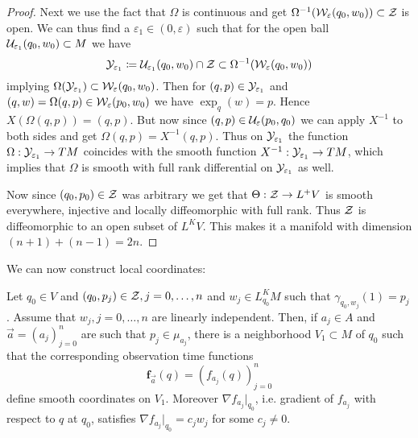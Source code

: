 \begin{proof}
    Next we use the fact that $\Omega$ is continuous and get $\Omega^{-1}({\mathcal{W}}_{\varepsilon}(q_0,w_0)) \subset {\mathcal{Z}}$ is open. We can thus find a $\varepsilon_1\in (0,\varepsilon)$ such that for the open ball ${\mathcal{U}}_{\varepsilon_1}(q_0,w_0)\subset M$ we have 
    \[
        {\mathcal{Y}}_{\varepsilon_1}\coloneqq {\mathcal{U}}_{\varepsilon_1}(q_0,w_0) \cap {\mathcal{Z}} \subset \Omega^{-1}({\mathcal{W}}_{\varepsilon}(q_0,w_0))
    \] implying $\Omega({\mathcal{Y}}_{\varepsilon_1}) \subset {\mathcal{W}}_{\varepsilon}(q_0,w_0)$. Then for $(q,p)\in {\mathcal{Y}}_{\varepsilon_1}$ and $(q,w) = \Omega(q,p)\in {\mathcal{W}}_\varepsilon(p_0,w_0)$ we have $\exp_q(w) = p$. Hence $X(\Omega(q,p))=(q,p)$. But now since $(q,p)\in \mathcal{U}_\varepsilon(p_0,q_0)$ we can apply $X^{-1}$ to both sides and get $\Omega(q,p)=X^{-1}(q,p)$. Thus on ${\mathcal{Y}}_{\varepsilon_1}$ the function $\Omega:{\mathcal{Y}}_{\varepsilon_1}\to TM$ coincides with the smooth function $X^{-1}:{\mathcal{Y}}_{\varepsilon_1}\to TM$, which implies that $\Omega$ is smooth with full rank differential on ${\mathcal{Y}}_{\varepsilon_1}$ as well.
    
    Now since $(q_0,p_0)\in {\mathcal{Z}}$ was arbitrary we get that $\Theta:{\mathcal{Z}}\to L^+V$ is smooth everywhere, injective and locally diffeomorphic with full rank. Thus ${\mathcal{Z}}$ is diffeomorphic to an open subset of $L^KV$. This makes it a manifold with dimension $(n+1)+(n-1)=2n$.
\end{proof}

We can now construct local coordinates:
\begin{proposition}\label{prop:observationtimecoordinates}
Let $q_0\in V$ and $(q_0,p_j)\in {\mathcal{Z}}, j=0,\dots, n$ and $w_j\in L^K_{q_0}M$ such that $\gamma_{q_0,w_j}(1) = p_j$. Assume that $w_j, j=0,\dots, n$ are linearly independent. Then, if $a_j\in A$ and $\overrightarrow{a} = (a_j)^n_{j=0}$ are such that $p_j\in \mu_{a_j}$, there is a neighborhood $V_1\subset M$ of $q_0$ such that the corresponding observation time functions 
\[
\mathbf{f}_{\overrightarrow{a}}(q) = (f_{a_j}(q))^n_{j=0}
\]
define smooth coordinates on $V_1$. Moreover $\nabla f_{a_j}\rvert_{q_0}$, i.e. gradient of $f_{a_j}$ with respect to $q$ at $q_0$, satisfies $\nabla f_{a_j}\rvert_{q_0} = c_jw_j$ for some $c_j\neq 0$.
\end{proposition}

